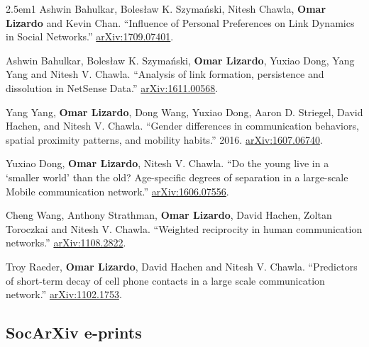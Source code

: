 \documentclass[
]{article}
\newenvironment{cventry}{\begin{hangparas}{2.5em}{1}}{\end{hangparas}}
\begin{document}
\begin{cventry}
Ashwin Bahulkar, Bolesław K. Szymański, Nitesh Chawla, \textbf{Omar
Lizardo} and Kevin Chan. ``Influence of Personal Preferences on Link
Dynamics in Social Networks.''
\href{https://arxiv.org/abs/1709.07401}{arXiv:1709.07401}.

Ashwin Bahulkar, Bolesław K. Szymański, \textbf{Omar Lizardo}, Yuxiao
Dong, Yang Yang and Nitesh V. Chawla. ``Analysis of link formation,
persistence and dissolution in NetSense Data.''
\href{https://arxiv.org/abs/1611.00568}{arXiv:1611.00568}.

Yang Yang, \textbf{Omar Lizardo}, Dong Wang, Yuxiao Dong, Aaron D.
Striegel, David Hachen, and Nitesh V. Chawla. ``Gender differences in
communication behaviors, spatial proximity patterns, and mobility
habits.'' 2016.
\href{https://arxiv.org/abs/1607.06740}{arXiv:1607.06740}.

Yuxiao Dong, \textbf{Omar Lizardo}, Nitesh V. Chawla. ``Do the young
live in a `smaller world' than the old? Age-specific degrees of
separation in a large-scale Mobile communication network.''
\href{https://arxiv.org/abs/1606.07556}{arXiv:1606.07556}.

Cheng Wang, Anthony Strathman, \textbf{Omar Lizardo}, David Hachen,
Zoltan Toroczkai and Nitesh V. Chawla. ``Weighted reciprocity in human
communication networks.''
\href{https://arxiv.org/abs/1108.2822}{arXiv:1108.2822}.

Troy Raeder, \textbf{Omar Lizardo}, David Hachen and Nitesh V. Chawla.
``Predictors of short-term decay of cell phone contacts in a large scale
communication network.''
\href{https://arxiv.org/abs/1102.1753}{arXiv:1102.1753}.

\end{cventry}

\subsection{SocArXiv e-prints}\label{socarxiv-e-prints}
\end{document}
